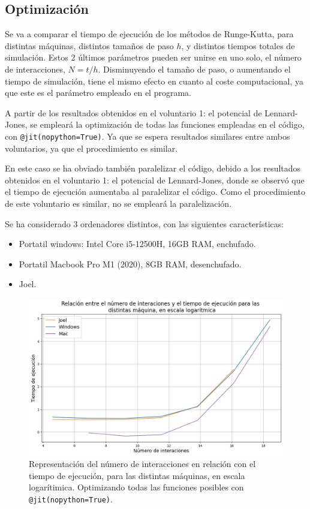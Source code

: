 \documentclass[11pt, twoside]{article} %
\begin{document}
\newpage

\subsection{Optimización}

Se va a comparar el tiempo de ejecución de los métodos de Runge-Kutta, para 
distintas máquinas, distintos tamaños de paso $h$, y distintos tiempos totales
de simulación. Estos 2 últimos parámetros pueden ser unirse en uno solo, 
el número de interacciones, $N = t/h$. Disminuyendo el tamaño de paso, o 
aumentando el tiempo de simulación, tiene el mismo efecto en cuanto al coste
computacional, ya que este es el parámetro empleado en el programa.

A partir de los resultados obtenidos en el voluntario 1: el potencial de 
Lennard-Jones, se empleará la optimización de todas las funciones empleadas 
en el código, con \texttt{@jit(nopython=True)}. Ya que se espera resultados 
similares entre ambos voluntarios, ya que el procedimiento es similar.

En este caso se ha obviado también paralelizar el código, debido a los resultados 
obtenidos en el voluntario 1: el potencial de Lennard-Jones, donde se observó 
que el tiempo de ejecución aumentaba al paralelizar el código. Como el procedimiento de
este voluntario es similar, no se empleará la paralelización.

Se ha considerado 3 ordenadores distintos, con las siguientes características:
\begin{itemize}
    \item Portatil windows: Intel Core i5-12500H, 16GB RAM, enchufado.
    \item Portatil Macbook Pro M1 (2020), 8GB RAM, desenchufado.
    \item Joel.
\end{itemize}

\begin{figure}[h!]
    \centering
    \includegraphics[width=\linewidth]{plots/optimizacion.png}
    \caption{Representación del número de interacciones en relación con el tiempo 
    de ejecución, para las distintas máquinas, en escala logarítimica. Optimizando
    todas las funciones posibles con \texttt{@jit(nopython=True)}.}
    \label{fig:optimizacion}
\end{figure}
\end{document}
